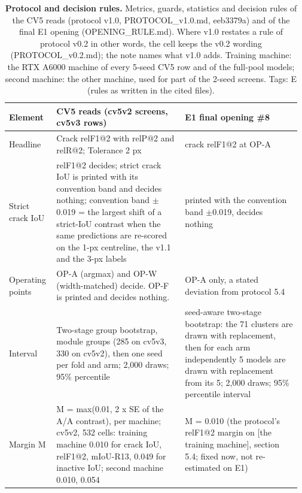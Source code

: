 \begin{table}[htbp]
\centering
\footnotesize
\setlength{\tabcolsep}{3pt}
\caption[Protocol and decision rules]{\textbf{Protocol and decision rules.} Metrics, guards, statistics and decision rules of the CV5 reads (protocol v1.0, PROTOCOL\_v1.0.md, eeb3379a) and of the final E1 opening (OPENING\_RULE.md). Where v1.0 restates a rule of protocol v0.2 in other words, the cell keeps the v0.2 wording (PROTOCOL\_v0.2.md); the note names what v1.0 adds. Training machine: the RTX A6000 machine of every 5-seed CV5 row and of the full-pool models; second machine: the other machine, used for part of the 2-seed screens. Tags: E (rules as written in the cited files).}
\label{tab:T4}
\begin{tabular}{@{}>{\raggedright\arraybackslash\hspace{0pt}}p{0.155\linewidth}>{\raggedright\arraybackslash\hspace{0pt}}p{0.425\linewidth}>{\raggedright\arraybackslash\hspace{0pt}}p{0.387\linewidth}@{}}
\toprule
\textbf{Element} & \textbf{CV5 reads (cv5v2 screens, cv5v3 rows)} & \textbf{E1 final opening \#8} \\
\midrule
Headline & Crack relF1@2 with relP@2 and relR@2; Tolerance 2 px & crack relF1@2 at OP-A \\
Strict crack IoU & relF1@2 decides; strict crack IoU is printed with its convention band and decides nothing; convention band $\pm$0.019 = the largest shift of a strict-IoU contrast when the same predictions are re-scored on the 1-px centreline, the v1.1 and the 3-px labels & printed with the convention band $\pm$0.019, decides nothing \\
Operating points & OP-A (argmax) and OP-W (width-matched) decide. OP-F is printed and decides nothing. & OP-A only, a stated deviation from protocol 5.4 \\
Interval & Two-stage group bootstrap, module groups (285 on cv5v3, 330 on cv5v2), then one seed per fold and arm; 2,000 draws; 95\% percentile & seed-aware two-stage bootstrap: the 71 clusters are drawn with replacement, then for each arm independently 5 models are drawn with replacement from its 5; 2,000 draws; 95\% percentile interval \\
Margin M & M = max(0.01, 2 x SE of the A/\allowbreak{}A contrast), per machine; cv5v2, 532 cells: training machine 0.010 for crack IoU, relF1@2, mIoU-R13, 0.049 for inactive IoU; second machine 0.010, 0.054 & M = 0.010 (the protocol's relF1@2 margin on [the training machine], section 5.4; fixed now, not re-estimated on E1) \\

\end{tabular}
\end{table}
